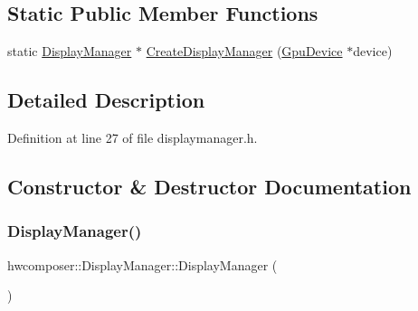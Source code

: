 \subsection*{Static Public Member Functions}
\begin{DoxyCompactItemize}
\item 
static \mbox{\hyperlink{classhwcomposer_1_1DisplayManager}{Display\+Manager}} $\ast$ \mbox{\hyperlink{classhwcomposer_1_1DisplayManager_aed4adf531c3ea168ff4e2f7c82fd1cbb}{Create\+Display\+Manager}} (\mbox{\hyperlink{classhwcomposer_1_1GpuDevice}{Gpu\+Device}} $\ast$device)
\end{DoxyCompactItemize}


\subsection{Detailed Description}


Definition at line 27 of file displaymanager.\+h.



\subsection{Constructor \& Destructor Documentation}
\mbox{\label{classhwcomposer_1_1DisplayManager_ae0d38f8308c54359c9de7e1c8e8f13c2}} 
\subsubsection{\texorpdfstring{Display\+Manager()}{DisplayManager()}}
{\footnotesize\ttfamily hwcomposer\+::\+Display\+Manager\+::\+Display\+Manager (\begin{DoxyParamCaption}{ }\end{DoxyParamCaption})\hspace{0.3cm}{\ttfamily [default]}}

\mbox{\label{classhwcomposer_1_1DisplayManager_a34d71bf6f39f064b958920bbdc07c761}} 
